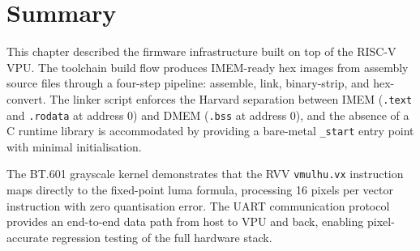 \section{Summary}
\label{sec:software_summary}

This chapter described the firmware infrastructure built on top of the RISC-V VPU.
The toolchain build flow produces IMEM-ready hex images from assembly source files
through a four-step pipeline: assemble, link, binary-strip, and hex-convert. The linker
script enforces the Harvard separation between IMEM (\texttt{.text} and \texttt{.rodata}
at address 0) and DMEM (\texttt{.bss} at address 0), and the absence of a C runtime
library is accommodated by providing a bare-metal \texttt{\_start} entry point with
minimal initialisation.

The BT.601 grayscale kernel demonstrates that the RVV \texttt{vmulhu.vx} instruction
maps directly to the fixed-point luma formula, processing 16 pixels per vector
instruction with zero quantisation error. The UART communication protocol provides an
end-to-end data path from host to VPU and back, enabling pixel-accurate regression
testing of the full hardware stack.
